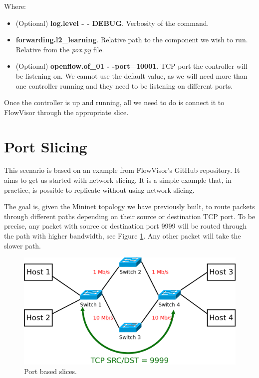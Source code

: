 Where:
\begin{itemize}
    \item (Optional) \textbf{log.level - - DEBUG}. Verbosity of the command.
    \item \textbf{forwarding.l2\_learning}. Relative path to the component we wish to run. Relative from the \textit{pox.py} file.
    \item (Optional) \textbf{openflow.of\_01 - -port=10001}. TCP port the controller will be listening on. We cannot use the default value, as we will need more than one controller running and they need to be listening on different ports.
\end{itemize}

Once the controller is up and running, all we need to do is connect it to FlowVisor through the appropriate slice.

\section{Port Slicing}
This scenario is based on an example from FlowVisor's GitHub repository\cite{flowvisor_example}. It aims to get us started with network slicing. It is a simple example that, in practice, is possible to replicate without using network slicing. 

The goal is, given the Mininet topology we have previously built, to route packets through different paths depending on their source or destination TCP port. To be precise, any packet with source or destination port 9999 will be routed through the path with higher bandwidth, see Figure \ref{fig:port_slicing}. Any other packet will take the slower path. 

\begin{figure}
  \centering
  \includegraphics[width=\linewidth]{imagenes/Implementation/mininet_topology_port_slicing.png}
  \caption{Port based slices.}
  \label{fig:port_slicing}
\end{figure}

